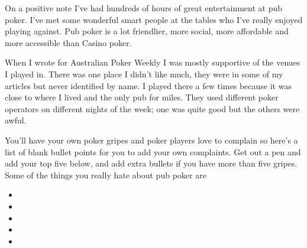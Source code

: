 On a positive note I've
had hundreds of hours of great entertainment at pub poker. I've
met some wonderful smart people at the tables who I've really enjoyed
playing against. Pub poker is a lot friendlier, more social, more
affordable and more accessible than Casino poker.

When I wrote for Australian Poker Weekly I was mostly supportive of
the venues I played in. There was one place I didn't like much, they
were in some of my articles but never identified by name. I played
there a few times because it was close to where I lived and the only
pub for miles. They used different poker operators on different nights
of the week; one was quite good but the others were awful.

You'll have your own poker gripes and poker players love to complain
so here's a list of blank bullet points for you to add your own
complaints. Get out a pen and add your top five below, and add extra
bullets if you have more than five gripes. Some of the things you
really hate about pub poker are

\begin{itemize}

\item


\item


\item


\item


\item


\end{itemize}
